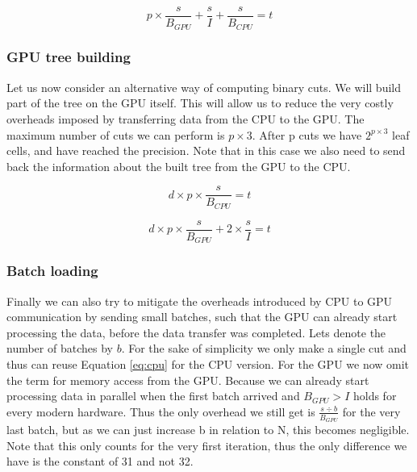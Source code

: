 \documentclass[]{article}
\begin{document}
\begin{center}
	\begin{equation}
		p \times \frac{s}{B_{GPU}} + \frac{s}{I}  + \frac{s}{B_{CPU}}= t
		\label{eq:gpu}
	\end{equation}
\end{center}

\vspace{5mm}


\subsubsection{GPU tree building}

Let us now consider an alternative way of computing binary cuts. We will build part of the tree on the GPU itself. This will allow us to reduce the very costly overheads imposed by transferring data from the CPU to the GPU. The maximum number of cuts we can perform is $p \times 3$. After p cuts we have $2^{p \times 3}$ leaf cells, and have reached the precision. Note that in this case we also need to send back the information about the built tree from the GPU to the CPU. 

\begin{center}
	\begin{equation}
		d \times p \times \frac{s}{B_{CPU}} = t
		\label{eq:cputree}
	\end{equation}
\end{center}

\begin{center}
	\begin{equation}
		d \times p \times \frac{s}{B_{GPU}} + 2 \times \frac{s}{I} = t
		\label{eq:gputree}
	\end{equation}
\end{center}


\subsubsection{Batch loading}

Finally we can also try to mitigate the overheads introduced by CPU to GPU communication by sending small batches, such that the GPU can already start processing the data, before the data transfer was completed. Lets denote the number of batches by $b$. For the sake of simplicity we only make a single cut and thus can reuse Equation \ref{eq:cpu} for the CPU version. For the GPU we now omit the term for memory access from the GPU. Because we can already start processing data in parallel when the first batch arrived and $B_{GPU} > I$ holds for every modern hardware. Thus the only overhead we still get is $\frac{s \div b}{B_{GPU}}$ for the very last batch, but as we can just increase b in relation to N, this becomes negligible. Note that this only counts for the very first iteration, thus the only difference we have is the constant of 31 and not 32. 
\end{document}
